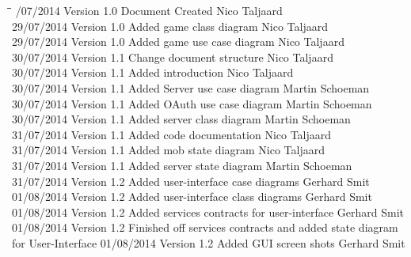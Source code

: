 \documentclass[letterpaper]{article}
\begin{document}
		\begin{tabbing}
			\hspace*{2.5cm}\=\hspace*{2.5cm}\=\hspace*{8cm}\=\hspace*{3cm} /07/2014	\> Version 1.0	\> Document Created 							\> Nico Taljaard \\
			29/07/2014	\> Version 1.0	\> Added game class diagram						\> Nico Taljaard \\
			29/07/2014	\> Version 1.0	\> Added game use case diagram					\> Nico Taljaard \\
			30/07/2014	\> Version 1.1	\> Change document structure					\> Nico Taljaard \\
			30/07/2014	\> Version 1.1	\> Added introduction							\> Nico Taljaard \\
			30/07/2014  \> Version 1.1  \> Added Server use case diagram				\> Martin Schoeman\\
			30/07/2014  \> Version 1.1  \> Added OAuth use case diagram					\> Martin Schoeman\\
			30/07/2014  \> Version 1.1  \> Added server class diagram					\> Martin Schoeman\\
			31/07/2014  \> Version 1.1  \> Added code documentation						\> Nico Taljaard\\
			31/07/2014  \> Version 1.1  \> Added mob state diagram						\> Nico Taljaard\\
			31/07/2014  \> Version 1.1  \> Added server state diagram					\> Martin Schoeman\\
			31/07/2014  \> Version 1.2  \> Added user-interface case diagrams			\> Gerhard Smit\\
			01/08/2014  \> Version 1.2  \> Added user-interface class diagrams			\> Gerhard Smit\\
			01/08/2014  \> Version 1.2  \> Added services contracts for user-interface 			\> Gerhard Smit\\
			01/08/2014  \> Version 1.2  \> Finished off services contracts and added state diagram for User-Interface	
			01/08/2014  \> Version 1.2  \> Added GUI screen shots		\> Gerhard Smit\\
		\end{tabbing}
		
	\newpage
		\renewcommand\contentsname{TABLE OF CONTENTS}
		\newcommand\contentsnameLC{\colorbox{blue}{\makebox[\textwidth-2\fboxsep][l]{\bfseries\color{white} Table of Contents}}}
		
		\renewcommand{\cftdot}{}
		\hypersetup{linktocpage}
		\tableofcontents
		
\end{document}
